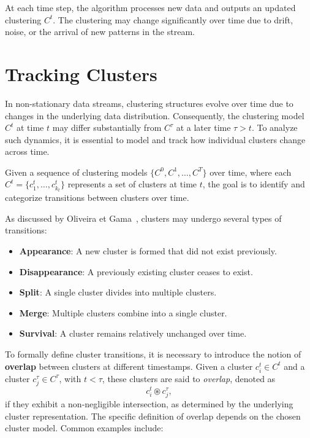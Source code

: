 At each time step, the algorithm processes new data and outputs an updated
clustering $C^t$. The clustering may change significantly over time due to
drift, noise, or the arrival of new patterns in the stream.

\section{Tracking Clusters}\label{sec:prob_tracking_clusters}
In non-stationary data streams, clustering structures evolve over time due to
changes in the underlying data distribution. Consequently, the clustering model
$C^t$ at time $t$ may differ substantially from $C^\tau$ at a later time $\tau
    > t$. To analyze such dynamics, it is essential to model and track how
individual clusters change across time.

Given a sequence of clustering models $\{C^0, C^1, \dots, C^T\}$ over time,
where each $C^t = \{c_1^t, \dots, c_{k_t}^t\}$ represents a set of clusters at
time $t$, the goal is to identify and categorize transitions between clusters
over time.

As discussed by Oliveira et Gama~\cite{mec}, clusters may undergo several types
of transitions:

\begin{itemize}
    \item \textbf{Appearance}: A new cluster is formed that did not exist previously.
    \item \textbf{Disappearance}: A previously existing cluster ceases to exist.
    \item \textbf{Split}: A single cluster divides into multiple clusters.
    \item \textbf{Merge}: Multiple clusters combine into a single cluster.
    \item \textbf{Survival}: A cluster remains relatively unchanged over time.
\end{itemize}

To formally define cluster transitions, it is necessary to introduce the notion
of \textbf{overlap} between clusters at different timestamps. Given a cluster $
    c_i^t \in C^t $ and a cluster $ c_j^\tau \in C^\tau $, with $ t < \tau $, these
clusters are said to \emph{overlap}, denoted as
\begin{equation}
    c_i^t \circledast c_j^\tau,
\end{equation}
if they exhibit a non-negligible intersection, as determined by the underlying
cluster representation. The specific definition of overlap depends on the chosen
cluster model. Common examples include:

